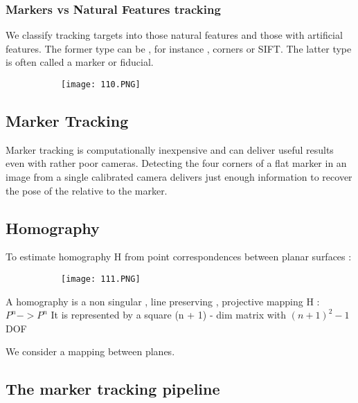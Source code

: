 \documentclass{article}
\begin{document}
\subsubsection{Markers vs Natural Features tracking}

We classify tracking targets into those natural features and those with artificial features.
The former type can be , for instance , corners or SIFT.
The latter type is often called a marker or fiducial.


\begin{figure}[ht!]
  \centering
  \begin{subfigure}[b]{0.4\linewidth}
    \texttt{[image: 110.PNG]}
  \end{subfigure}
\end{figure}

\subsection{Marker Tracking}

Marker tracking is computationally inexpensive and can deliver useful results even with rather poor cameras.
Detecting the four corners of a flat marker in an image from a single calibrated camera delivers just enough information to recover the pose of the relative to the marker.


\subsection{Homography}

To estimate homography H from point correspondences between planar surfaces : 

\begin{figure}[ht!]
  \centering
  \begin{subfigure}[b]{0.4\linewidth}
    \texttt{[image: 111.PNG]}
  \end{subfigure}
\end{figure}

A homography is a non singular , line preserving , projective mapping H : $P^n -> P^n$
It is represented by a square (n + 1) - dim matrix with $(n+1)^2 -1$ DOF

We consider a mapping between planes.


\subsection{The marker tracking pipeline}
\end{document}
